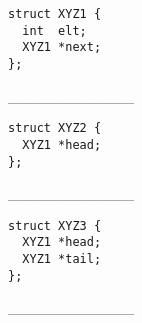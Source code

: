 \documentclass[11pt,a4paper]{article}
\begin{document}
\vspace*{-0.5cm}


\begin{center}

\begin{table}[ht!]
  \centering
  \begin{minipage}{0.30\textwidth}
    \centering

\lstset{language=C}
\begin{lstlisting}[frame=single]
struct XYZ1 {
  int  elt;
  XYZ1 *next;
};
\end{lstlisting}

\_\_\_\_\_\_\_\_\_\_\_\_

  \end{minipage}
  \hfillx
  \begin{minipage}{0.30\textwidth}
    \centering

\lstset{language=C}
\begin{lstlisting}[frame=single]
struct XYZ2 {
  XYZ1 *head;
};
\end{lstlisting}

\_\_\_\_\_\_\_\_\_\_\_\_

  \end{minipage}
  \hfillx
  \begin{minipage}{0.30\textwidth}
    \centering

\lstset{language=C}
\begin{lstlisting}[frame=single]
struct XYZ3 {
  XYZ1 *head;
  XYZ1 *tail;
};
\end{lstlisting}

\_\_\_\_\_\_\_\_\_\_\_\_

  \end{minipage}
\end{table}

\end{center}

\vspace*{3cm}
\end{document}
